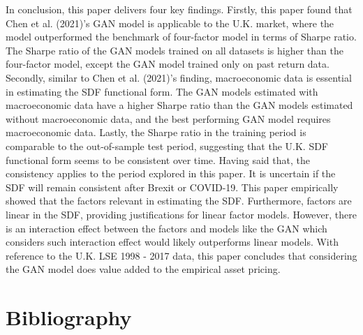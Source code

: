 \documentclass[12pt]{article}
\begin{document}
In conclusion, this paper delivers four key findings.
Firstly, this paper found that Chen et al. (2021)'s GAN model
is applicable to the U.K. market, where the model outperformed the
benchmark of four-factor model in terms of Sharpe ratio.
The Sharpe ratio of the GAN models trained on all datasets
is higher than the four-factor model, except the GAN
model trained only on past return data.
Secondly, similar to Chen et al. (2021)'s finding,
macroeconomic data is essential in estimating the SDF functional
form.
The GAN models estimated with macroeconomic data have a
higher Sharpe ratio than the GAN models estimated
without macroeconomic data, and the best performing
GAN model requires macroeconomic data.
Lastly,
the Sharpe ratio in the training period is comparable to the
out-of-sample test period, suggesting that the U.K. SDF
functional form seems to be consistent over time.
Having said that, the consistency applies to the period
explored in this paper. It is uncertain if the SDF will remain
consistent after Brexit or COVID-19.
This paper empirically showed that the factors relevant in
estimating the SDF. Furthermore, factors are linear in the
SDF, providing justifications for linear factor models.
However, there is an interaction effect between the factors
and models like the GAN which considers such interaction effect
would likely outperforms linear models.
With reference to the U.K. LSE 1998 - 2017 data,
this paper concludes that considering the GAN model does
value added to the empirical asset pricing.

\newpage

\hypertarget{bibliography}{%
\section{Bibliography}\label{bibliography}}

\thispagestyle{plain}
\end{document}
